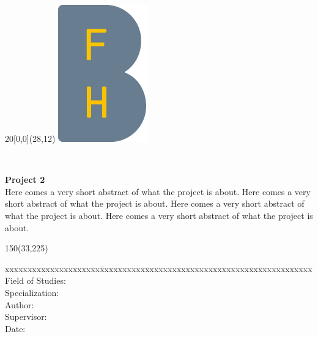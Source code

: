 
\begin{titlepage}

\setlength{\unitlength}{1mm}

\begin{textblock}{20}[0,0](28,12)
    \includegraphics[scale=1.0]{../img/BFH_Logo_B.png}
\end{textblock}

\begin{flushleft}

\vspace*{21mm}

\fontsize{26pt}{40pt}\selectfont
{\doctitle}	\\
\vspace{2mm}

\fontsize{16pt}{24pt}\selectfont\vspace{0.3em}
\docsubtitle
\vspace{5mm}

\fontsize{10pt}{12pt}\selectfont
\textbf{Project 2} \\

\fontsize{10pt}{12pt}\selectfont
Here comes a very short abstract of what the project is about. Here comes a very short abstract of what the project is about. Here comes a very short abstract of what the project is about. Here comes a very short abstract of what the project is about. 

\begin{textblock}{150}(33,225)
\fontsize{10pt}{17pt}
\begin{tabbing}
xxxxxxxxxxxxxxxxxxxxx\=xxxxxxxxxxxxxxxxxxxxxxxxxxxxxxxxxxxxxxxxxxxxxxx \kill
Field of Studies:	\> \fieldofstudies	\\
Specialization:	    \> \specialisation	\\
Author:		        \> \docauthor \\
Supervisor:         \> \prof \\
Date:			    \> \versiondate \\
\end{tabbing}


\end{textblock}
\end{flushleft}
\end{titlepage}
